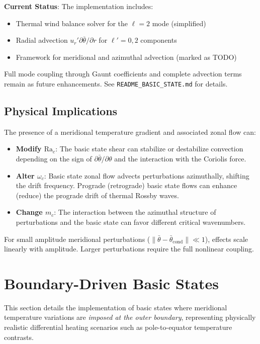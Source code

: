 \documentclass[11pt]{article}
\numberwithin{equation}{section}
\begin{document}
\textbf{Current Status}: The implementation includes:
\begin{itemize}
  \item Thermal wind balance solver for the $\ell=2$ mode (simplified)
  \item Radial advection $u_r' \partial\bar{\theta}/\partial r$ for $\ell'=0,2$ components
  \item Framework for meridional and azimuthal advection (marked as TODO)
\end{itemize}

Full mode coupling through Gaunt coefficients and complete advection terms remain as future enhancements. See \texttt{README\_BASIC\_STATE.md} for details.

\subsection{Physical Implications}

The presence of a meridional temperature gradient and associated zonal flow can:
\begin{itemize}
  \item \textbf{Modify $\mathrm{Ra}_c$}: The basic state shear can stabilize or destabilize convection depending on the sign of $\partial\bar{\theta}/\partial\theta$ and the interaction with the Coriolis force.

  \item \textbf{Alter $\omega_c$}: Basic state zonal flow advects perturbations azimuthally, shifting the drift frequency. Prograde (retrograde) basic state flows can enhance (reduce) the prograde drift of thermal Rossby waves.

  \item \textbf{Change $m_c$}: The interaction between the azimuthal structure of perturbations and the basic state can favor different critical wavenumbers.
\end{itemize}

For small amplitude meridional perturbations ($\|\bar{\theta} - \bar{\theta}_{\text{cond}}\| \ll 1$), effects scale linearly with amplitude. Larger perturbations require the full nonlinear coupling.

\section{Boundary-Driven Basic States}
\label{sec:boundary_driven}

This section details the implementation of basic states where meridional temperature variations are \emph{imposed at the outer boundary}, representing physically realistic differential heating scenarios such as pole-to-equator temperature contrasts.
\end{document}
